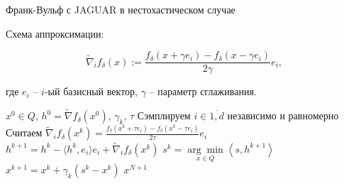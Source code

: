 \documentclass{beamer}
\begin{document}

\begin{frame}{Франк-Вульф с JAGUAR в нестохастическом случае}

    Схема аппроксимации:

        \begin{equation*}
            \widetilde{\nabla}_if_\delta(x) :=  \dfrac{f_\delta(x + \gamma e_i) - f_\delta(x - \gamma e_i)}{2 \gamma} e_i,
        \end{equation*}

    где $e_i$ -- $i$-ый базисный вектор, $\gamma$ -- параметр сглаживания.
    
    \begin{algorithm}[H]
        \caption{ФВ с JAGUAR в нестохастическом случае}
        \begin{algorithmic}[1]
             $x^0 \in Q$, $h^0 = \widetilde\nabla f_{\delta}(x^0)$, $\gamma_k$, $\tau$
                \State Сэмплируем $i \in \overline{1, d}$ независимо и равномерно
                \State Считаем $\widetilde{\nabla}_i f_{\delta}(x^k) = \frac{f_{\delta}(x^k + \tau e_i) - f_{\delta}(x^k - \tau e_i)}{2 \tau} e_i$
                \State  $h^{k + 1} = h^k - \langle h^k, e_i \rangle e_i + \widetilde{\nabla}_i f_{\delta}(x^k)$
                \State $s^k = \underset{x \in Q}{\arg\min}\left<s, h^{k+1} \right>$
                \State $x^{k+1} = x^k + \gamma_k (s^k - x^k)$
            \EndFor
             $x^{N + 1}$
        \end{algorithmic}
    \end{algorithm}
        
\end{frame}

\end{document}
